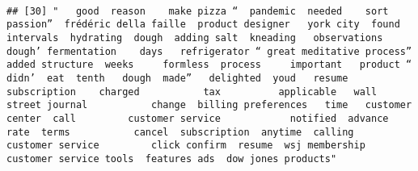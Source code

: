 \documentclass[
]{article}
\begin{document}
\begin{verbatim}
                                                                                                                                                                                                                                                                                                                                                                                                                                                                   
## [30] "   good  reason    make pizza “  pandemic  needed    sort  passion”  frédéric della faille  product designer   york city  found  intervals  hydrating  dough  adding salt  kneading   observations   dough’ fermentation    days   refrigerator “ great meditative process”  added structure  weeks     formless  process     important   product “ didn’  eat  tenth   dough  made”   delighted  youd   resume  subscription    charged           tax          applicable   wall street journal           change  billing preferences   time   customer center  call         customer service            notified  advance     rate  terms           cancel  subscription  anytime  calling         customer service         click confirm  resume  wsj membership customer service tools  features ads  dow jones products"                                                                                                                                                                                                                                                                                                                                                                                                                                                                                                                                                                                                                                                                                                                                                                                                                                                                                                                                                                                                                                                                                                                                                                                                                                                                                                                                                                                                                                                                                                                                                                                                                                                                                                                                                                                                                                                                                                                                                                                                                                                                                                                                             
\end{verbatim}
\end{document}
